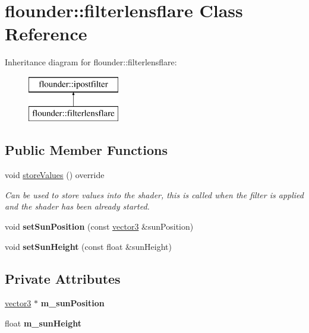 \hypertarget{classflounder_1_1filterlensflare}{}\section{flounder\+:\+:filterlensflare Class Reference}
\label{classflounder_1_1filterlensflare}
Inheritance diagram for flounder\+:\+:filterlensflare\+:\begin{figure}[H]
\begin{center}
\leavevmode
\includegraphics[height=2.000000cm]{classflounder_1_1filterlensflare}
\end{center}
\end{figure}
\subsection*{Public Member Functions}
\begin{DoxyCompactItemize}
\item 
void \hyperlink{classflounder_1_1filterlensflare_a2ab19cc2427e840c9ae11fc004e963be}{store\+Values} () override
\begin{DoxyCompactList}\small\item\em Can be used to store values into the shader, this is called when the filter is applied and the shader has been already started. \end{DoxyCompactList}\item 
\mbox{\label{classflounder_1_1filterlensflare_acf8079971964f7e36d05fb96acddc9aa}} 
void {\bfseries set\+Sun\+Position} (const \hyperlink{classflounder_1_1vector3}{vector3} \&sun\+Position)
\item 
\mbox{\label{classflounder_1_1filterlensflare_a3c3956ed82d5b68e5c577b8e3639b263}} 
void {\bfseries set\+Sun\+Height} (const float \&sun\+Height)
\end{DoxyCompactItemize}
\subsection*{Private Attributes}
\begin{DoxyCompactItemize}
\item 
\mbox{\label{classflounder_1_1filterlensflare_aa437a3fdb68b06998eadfbd0e1067b63}} 
\hyperlink{classflounder_1_1vector3}{vector3} $\ast$ {\bfseries m\+\_\+sun\+Position}
\item 
\mbox{\label{classflounder_1_1filterlensflare_a85a74873a0dc6b5f8886fb74a0760a1f}} 
float {\bfseries m\+\_\+sun\+Height}
\end{DoxyCompactItemize}
